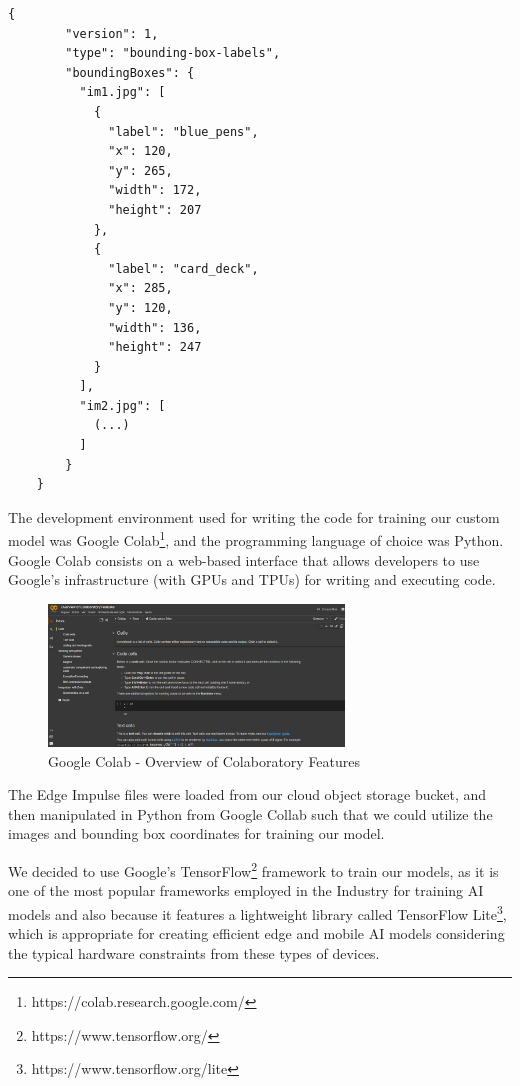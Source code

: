 \documentclass[openright]{normas-utf-tex} %
\begin{document}
\begin{lstlisting}[caption={Bounding boxes coordinates file exported from Edge Impulse},label={lst:boundingBoxCoordinates}]
	{
		"version": 1,
		"type": "bounding-box-labels",
		"boundingBoxes": {
		  "im1.jpg": [
			{
			  "label": "blue_pens",
			  "x": 120,
			  "y": 265,
			  "width": 172,
			  "height": 207
			},
			{
			  "label": "card_deck",
			  "x": 285,
			  "y": 120,
			  "width": 136,
			  "height": 247
			}
		  ],
		  "im2.jpg": [
			(...)
		  ]
		}
	}
\end{lstlisting}

The development environment used for writing the code for training our custom model
was Google Colab\footnote{https://colab.research.google.com/}, and the programming language 
of choice was Python. 
Google Colab consists on a web-based interface that allows developers
to use Google's infrastructure (with GPUs and TPUs) for writing and executing code.

\begin{figure}[H]
	\centering
	\includegraphics[width=0.7\textwidth]{./images/google-colab.png}
	\caption[Google Colab - Overview of Colaboratory Features]{Google Colab - Overview of Colaboratory Features}
    \label{fig:diff}
\end{figure}

The Edge Impulse files were loaded from our cloud object storage bucket, and then manipulated in Python
from Google Collab such that we could utilize the images and bounding box coordinates for training
our model.

We decided to use Google's TensorFlow\footnote{https://www.tensorflow.org/} framework to train our 
models, as it is one of the most popular frameworks employed in the Industry for training AI models
and also because it features a lightweight library called TensorFlow Lite\footnote{https://www.tensorflow.org/lite}, 
which is appropriate for creating efficient edge and mobile AI models considering the 
typical hardware constraints from these types of devices.
\end{document}
